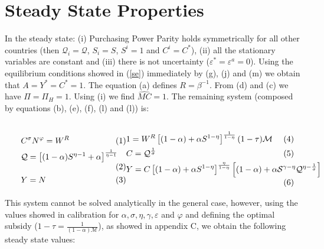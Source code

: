 \documentclass{article}
\begin{document}
\section{Steady State Properties}
In the steady state: (i) Purchasing Power Parity holds symmetrically for all other countries (then $\mathcal Q_i = \mathcal Q$, $S_i = S$, $S^i=1$ and $C^i = C^*$), (ii) all the stationary variables are constant and (iii) there is not uncertainty ($\varepsilon^* = \varepsilon^a = 0$).  Using the equilibrium conditions showed in (\ref{se}) immediately by (g), (j) and (m) we obtain that $A = Y^* = C^* = 1$. The equation (a) defines $R = \beta^{-1}$. From (d) and (c) we have $\Pi = \Pi_H = 1$. Using (i) we find $\widehat{MC} = 1$. The remaining system (composed by equations (b), (e), (f), (l) and (l)) is:

\begin{subequations}
    \label{ser}
    \begin{minipage}{0.4\textwidth}
        \begin{align}
            & C^\sigma N^\varphi = W^R \\
            &\mathcal{Q} = \left[(1-\alpha)S^{\eta-1} + \alpha \right]^{\frac{1}{\eta-1}}\\
            &Y =  N
        \end{align}
    \end{minipage}
    \begin{minipage}{0.59\textwidth}
        \begin{align}
            &1 = W^R \left[(1-\alpha) + \alpha S^{1-\eta} \right]^{\frac{1}{1-\eta}} (1 - \tau) \mathcal M\\
            &C = \mathcal Q^{\frac{1}{\sigma}}\\
            &Y = C \left[(1-\alpha) + \alpha S^{1-\eta} \right]^{\frac{\eta}{1-\eta}} \left[(1-\alpha)  +  \alpha \mathcal S^{\gamma - \eta} \mathcal Q^{\eta - \frac{1}{\sigma}} \right]
        \end{align}
    \end{minipage}
\end{subequations}

\vspace{6pt}

This system cannot be solved analytically in the general case, however, using the values showed in calibration for $\alpha, \sigma, \eta, \gamma, \varepsilon$ and $\varphi$ and defining the optimal subsidy ($ 1-\tau = \frac{1}{(1-\alpha)\mathcal M}  $), as showed in appendix C, we obtain the following steady state values:
\end{document}
